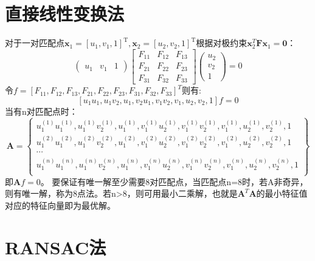 \section{直接线性变换法}
对于一对匹配点$\boldsymbol{x}_{1}=\left[ u_{1},v_{1},1\right]^{\mathrm{T}}, \boldsymbol{x}_{2}=\left[ u_{2},v_{2},1\right]^{\mathrm{T}}$根据对极约束$\boldsymbol{x}_{2}^{T} \boldsymbol{F x}_{1}=\mathbf{0}$：
\begin{equation}
\left( \begin{array}{ccc}{u_{1}} & {v_{1}} & {1}\end{array}\right) \left[ \begin{array}{ccc}{F_{11}} & {F_{12}} & {F_{13}} \\ {F_{21}} & {F_{22}} & {F_{23}} \\ {F_{31}} & {F_{32}} & {F_{33}}\end{array}\right] \left( \begin{array}{l}{u_{2}} \\ {v_{2}} \\ {1}\end{array}\right)=0
\end{equation}
令$f=\left[ F_{11},F_{12},F_{13},F_{21},F_{22},F_{23},F_{31},F_{32},F_{33} \right]^{T}$则有:
\begin{equation}
\left[
{u_{1} u_{1},}{u_{1} v_{2},}{u_{1},}{v_{2} u_{1},}{v_{1} v_{2},}{v_{1},}{u_{2},}{v_{2},}{1}
\right] f=0
\end{equation}
当有n对匹配点时：
\begin{equation}
\boldsymbol{A}=
\left\lbrace
	\begin{array}{c}
	u_{1}^{(1)} u_{1}^{(1)}, u_{1}^{(1)} v_{2}^{(1)}, u_{1}^{(1)},  v_{1}^{(1)} u_{2}^{(1)}, v_{1}^{(1)} v_{2}^{(1)}, v_{1}^{(1)}, u_{2}^{(1)}, v_{2}^{(1)},1\\
	u_{1}^{(2)} u_{1}^{(2)}, u_{1}^{(2)} v_{2}^{(2)}, u_{1}^{(2)},  v_{1}^{(2)} u_{2}^{(2)}, v_{1}^{(2)} v_{2}^{(2)}, v_{1}^{(2)}, u_{2}^{(2)}, v_{2}^{(2)},1\\
	\cdots\\
	u_{1}^{(n)} u_{1}^{(n)}, u_{1}^{(n)} v_{2}^{(n)}, u_{1}^{(n)},  v_{1}^{(n)} u_{2}^{(n)}, v_{1}^{(n)} v_{2}^{(n)}, v_{1}^{(n)}, u_{2}^{(n)}, v_{2}^{(n)},1\\
	\end{array}
\right\rbrace 
\end{equation}
即$\boldsymbol{A}f=0$。
要保证有唯一解至少需要8对匹配点，当匹配点n=8时，若A非奇异，则有唯一解，称为8点法。若n>8，则可用最小二乘解，也就是$\boldsymbol{A}^T\boldsymbol{A}$的最小特征值对应的特征向量即为最优解。
\section{RANSAC法}









